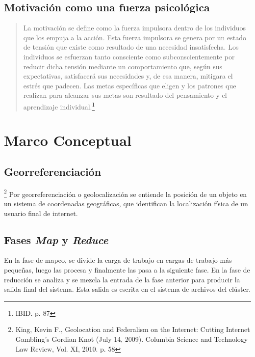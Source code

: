 \subsection{Motivaci\'on como una fuerza psicol\'ogica}
\begin{quote}
La motivaci\'on se define como la fuerza impulsora dentro de los individuos que los empuja a la acci\'on. Esta fuerza impulsora se genera por un estado de tensi\'on que existe como resultado de una necesidad insatisfecha. Los individuos se esfuerzan tanto consciente como subconscientemente por reducir dicha tensi\'on mediante un comportamiento que, seg\'un sus expectativas, satisfacer\'a sus necesidades y, de esa manera, mitigara el estr\'es que padecen. Las metas espec\'ificas que eligen y los patrones que realizan para alcanzar sus metas son resultado del pensamiento y el aprendizaje individual.\footnote{IBID. p. 87}
\end{quote}
\section{Marco Conceptual}
\subsection{Georreferenciaci\'on}\footnote{King, Kevin F., Geolocation and Federalism on the Internet: Cutting Internet Gambling’s Gordian Knot (July 14, 2009). Columbia Science and Technology Law Review, Vol. XI, 2010. p. 58}
Por georreferenciaci\'on o geolocalizaci\'on se entiende la posici\'on de un objeto en un sistema de coordenadas geogr\'aficas, que identifican la localizaci\'on f\'isica de un usuario final de internet.
\subsection{Fases \textit{Map} y \textit{Reduce}}
En la fase de mapeo, se divide la carga de trabajo en cargas de trabajo m\'as peque\~nas, luego las procesa y finalmente las pasa a la siguiente fase. En la fase de reducci\'on se analiza y se mezcla la entrada de la fase anterior para producir la salida final del sistema. Esta salida es escrita en el sistema de archivos del cl\'uster.

